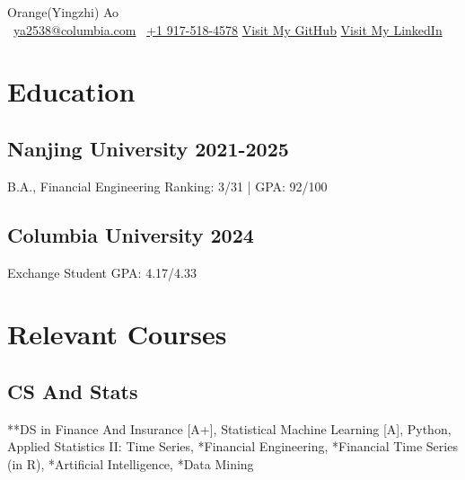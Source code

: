 \documentclass[a4paper]{article}
\newcommand{\org}{\color{org}}
\begin{document}
\begin{center}      
    {\fontsize{28}{28}\selectfont Orange(Yingzhi) Ao} \\ \vspace{10pt}
    {\org\faEnvelope[regular]}\ \href{mailto:ya2538@columbia.edu}{ya2538@columbia.com} \hfill
    {\org{}}\ \href{tel:+1 9175184578}{+1 917-518-4578} \hfill
    {\org\faGithub} \href{https://github.com/OrangeAoo}{Visit My GitHub}  \hfill
    {\org\faLinkedin} \href{http://linkedin.com/in/orange-ao}{Visit My LinkedIn}
\end{center}




\section{Education}  %

\subsection{Nanjing University \normalfont \hfill 2021-2025}
B.A., Financial Engineering \hfill Ranking: 3/31 | GPA: 92/100

\subsection{Columbia University  \normalfont \hfill 2024}
Exchange Student \hfill GPA: 4.17/4.33

\section{Relevant Courses}
\subsection{CS And Stats}
**DS in Finance And Insurance [A+], Statistical Machine Learning [A], Python, Applied Statistics II: Time Series, *Financial Engineering, *Financial Time Series (in R), *Artificial Intelligence, *Data Mining
\end{document}
